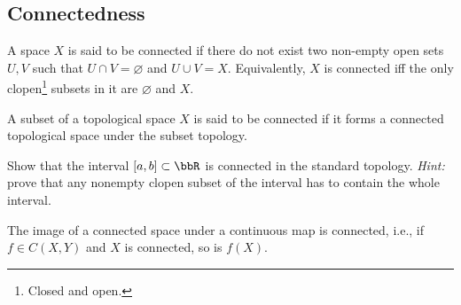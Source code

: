 



\subsection{Connectedness}

\begin{defn}
    A space $X$ is said to be connected if there do not exist two non-empty open sets $U,V$ such that $U\cap V=\varnothing$ and $U\cup V=X$.
    Equivalently, $X$ is connected iff the only clopen\footnote{Closed and open.} subsets in it are $\varnothing$ and $X$.
\end{defn}


\begin{defn}
    A subset of a topological space $X$ is said to be connected if it forms a connected topological space under the subset topology.
\end{defn}

\begin{xca}
    Show that the interval $[a,b]\subset\bbR $ is connected in the standard topology. \emph{Hint:} prove that any nonempty clopen subset of the interval has to contain the whole interval.
\end{xca}


\begin{prop}
    The image of a connected space under a continuous map is connected, i.e., if $f\in C(X,Y)$ and $X$ is connected, so is $f(X)$.
\end{prop}

